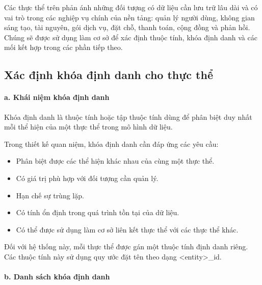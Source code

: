Các thực thể trên phản ánh những đối tượng có dữ liệu cần lưu trữ lâu dài và có vai trò trong các nghiệp vụ chính của nền tảng: quản lý người dùng, không gian sáng tạo, tài nguyên, gói dịch vụ, đặt chỗ, thanh toán, cộng đồng và phản hồi. Chúng sẽ được sử dụng làm cơ sở để xác định thuộc tính, khóa định danh và các mối kết hợp trong các phần tiếp theo.

\subsection{Xác định khóa định danh cho thực thể}

\paragraph{a. Khái niệm khóa định danh}

Khóa định danh là thuộc tính hoặc tập thuộc tính dùng để phân biệt duy nhất mỗi thể hiện của một thực thể trong mô hình dữ liệu.

Trong thiết kế quan niệm, khóa định danh cần đáp ứng các yêu cầu:

\begin{itemize}
\item Phân biệt được các thể hiện khác nhau của cùng một thực thể.
\item Có giá trị phù hợp với đối tượng cần quản lý.
\item Hạn chế sự trùng lặp.
\item Có tính ổn định trong quá trình tồn tại của dữ liệu.
\item Có thể được sử dụng làm cơ sở liên kết thực thể với các thực thể khác.

\end{itemize}
Đối với hệ thống này, mỗi thực thể được gán một thuộc tính định danh riêng. Các thuộc tính này sử dụng quy ước đặt tên theo dạng <entity>\_id.

\paragraph{b. Danh sách khóa định danh}

